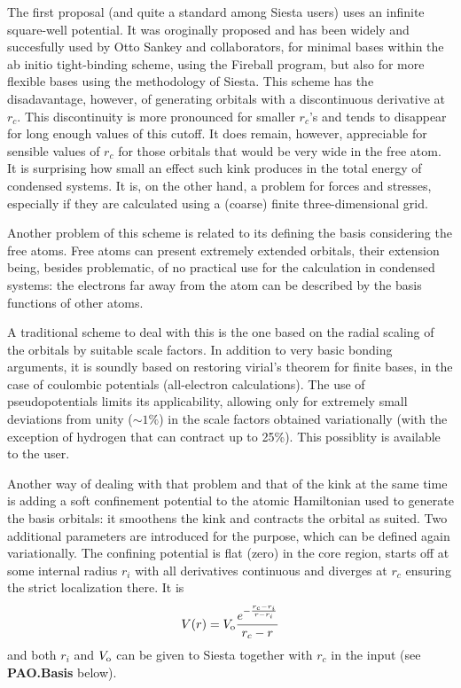 \documentclass[11pt]{article}
\begin{document}
  The first proposal (and quite a standard among {\sc Siesta}
users) uses an infinite square-well potential.
  It was oroginally proposed and has been widely and succesfully used 
by Otto Sankey and collaborators, for minimal bases within 
the ab initio tight-binding scheme, using the {\sc Fireball } program, 
but also for more flexible bases using the methodology of {\sc Siesta}.
  This scheme has the disadavantage, however, of generating 
orbitals with a discontinuous derivative at $r_c$. 
  This discontinuity is more pronounced for smaller $r_c$'s and
tends to disappear for long enough values of this cutoff.
  It does remain, however, appreciable for sensible values of
$r_c$ for those orbitals that would be very wide in the free atom.
  It is surprising how small an effect such kink produces in the
total energy of condensed systems.
  It is, on the other hand, a problem for forces and stresses,
especially if they are calculated using a (coarse) finite 
three-dimensional grid.

  Another problem of this scheme is related to its defining the
basis considering the free atoms. 
  Free atoms can present extremely
extended orbitals, their extension being, besides problematic,
of no practical use for the calculation in condensed systems:
the electrons far away from the atom can be described by the
basis functions of other atoms.
 
  A traditional scheme to deal with this is the one based on the radial 
scaling of the orbitals by suitable scale factors.
  In addition to very basic bonding arguments, it is
soundly based on restoring virial's theorem for finite bases, in the case
of coulombic potentials (all-electron calculations).
  The use of pseudopotentials limits its applicability, allowing only for
extremely small deviations from unity ($\sim 1\%$) in the scale factors 
obtained variationally (with the exception of hydrogen that can contract 
up to 25\%). This possiblity is available to the user.

  Another way of dealing with that problem and that of the kink at the
same time is adding a soft confinement potential to the atomic Hamiltonian 
used to generate the basis orbitals: it smoothens
the kink and contracts the orbital as suited. Two additional parameters
are introduced for the purpose, which can be defined again variationally.
  The confining potential  is flat (zero) in the core region, starts off at
some internal radius $r_i$ with all derivatives continuous
and diverges at $r_c$ ensuring the strict localization there.
  It is
\begin{equation}
  V(r) = V_{\rm o} { e^{- { {r_c - r_i} \over {r - r_i} } } \over {r_c -r} } 
\end{equation}
and both $r_i$ and $V_{\rm o}$ can be given to {\sc Siesta} together
with $r_c$ in the input (see {\bf PAO.Basis} below).
\end{document}

